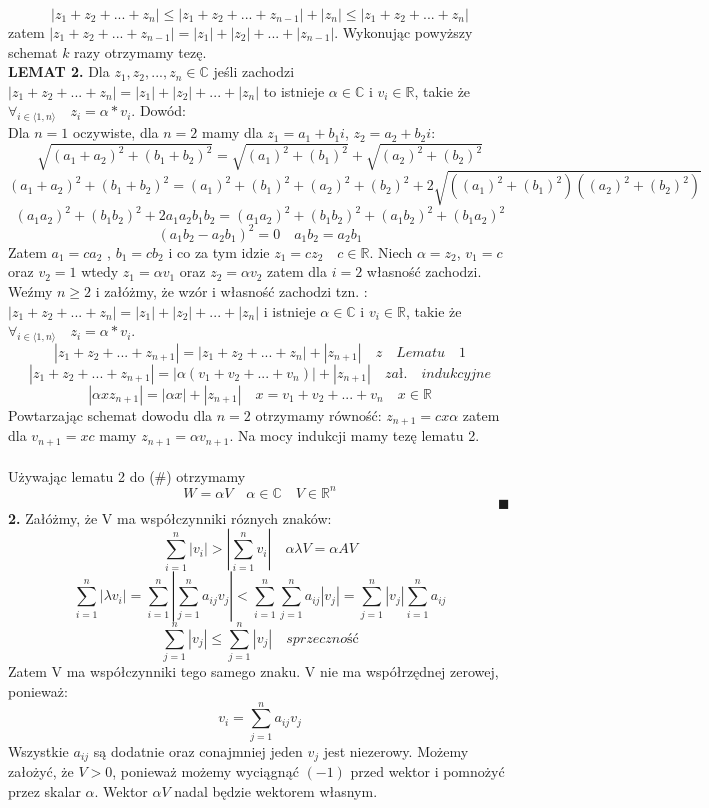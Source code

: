\documentclass[a4paper]{article}
\newcommand*{\field}[1]{\mathbb{#1}}
\begin{document}
\begin{adjustwidth}{30pt}{30pt}
$$|z_{1} + z_{2} + ... + z_{n}| \leq |z_{1} + z_{2} + ... + z_{n-1}| + |z_{n}| \leq |z_{1} + z_{2} + ... + z_{n}|$$ zatem $|z_{1} + z_{2} + ... + z_{n-1}| = |z_{1}| + |z_{2}| + ... + |z_{n-1}|$. Wykonując powyższy schemat $k$ razy otrzymamy tezę.\\
\textbf{LEMAT 2.} Dla $z_{1},z_{2},...,z_{n} \in \field{C}$ jeśli zachodzi $|z_{1} + z_{2} + ... + z_{n}| = |z_{1}| + |z_{2}| + ... + |z_{n}|$ to istnieje $\alpha \in  \field{C}$ i $v_{i} \in \field{R}$, takie że $\forall_{i \in \langle 1,n\rangle} \quad z_{i} = \alpha * v_{i}$. Dowód:\\
Dla $ n = 1$ oczywiste, dla $n = 2$ mamy dla $z_{1} = a_{1} + b_{1}i$, $z_{2} = a_{2} + b_{2}i$:
$$\sqrt{(a_{1} + a_{2})^2 +(b_{1} + b_{2})^2} = \sqrt{(a_{1})^2 + (b_{1})^2} + \sqrt{(a_{2})^2 + (b_{2})^2}$$
$$(a_{1} + a_{2})^2 +(b_{1} + b_{2})^2 = (a_{1})^2 + (b_{1})^2 + (a_{2})^2 + (b_{2})^2 + 2\sqrt{((a_{1})^2 + (b_{1})^2)((a_{2})^2 + (b_{2})^2)}$$
$$(a_{1}a_{2})^2 + (b_{1}b_{2})^2 + 2a_{1}a_{2}b_{1}b_{2} = (a_{1}a_{2})^2 + (b_{1}b_{2})^2 + (a_{1}b_{2})^2 + (b_{1}a_{2})^2$$
$$ (a_{1}b_{2} - a_{2}b_{1})^2 = 0 \quad a_{1}b_{2} = a_{2}b_{1}$$
Zatem $a_{1} = ca_{2}$ , $b_{1} = cb_{2}$ i co za tym idzie $z_{1} = cz_{2} \quad c \in \field{R}$. Niech $\alpha = z_{2}$, $v_{1} = c$ oraz $v_{2} = 1$ wtedy $z_{1} = \alpha v_{1}$ oraz $z_{2} = \alpha v_{2}$ zatem dla $i = 2$ własność zachodzi.\\
Weźmy $ n  \geq 2$ i załóżmy, że wzór i własność zachodzi tzn. : $|z_{1} + z_{2} + ... + z_{n}| = |z_{1}| + |z_{2}| + ... + |z_{n}|$ i istnieje $\alpha \in  \field{C}$ i $v_{i} \in \field{R}$, takie że $\forall_{i \in \langle 1,n\rangle} \quad z_{i} = \alpha * v_{i}$.
$$|z_{1} + z_{2} + ... + z_{n + 1}| = |z_{1} + z_{2} + ... + z_{n}| + |z_{n+1}| \quad z \quad Lematu \quad 1$$
$$|z_{1} + z_{2} + ... + z_{n + 1}| = |\alpha(v_{1} + v_{2} + ... + v_{n})| + |z_{n+1}| \quad zał. \quad indukcyjne$$
$$|\alpha x z_{n + 1}| = |\alpha x| + |z_{n+1}| \quad x = v_{1} + v_{2} + ... + v_{n} \quad x \in \field{R}$$
Powtarzając schemat dowodu dla $ n = 2$ otrzymamy równość: $z_{n+1} = cx\alpha$ zatem dla $v_{n+1} = xc$ mamy $z_{n+1} = \alpha v_{n + 1}$. Na mocy indukcji mamy tezę lematu 2.\\\\
Używając lematu 2 do (\#) otrzymamy
$$W = \alpha V \quad \alpha \in \field{C} \quad V \in \field{R}^{n}$$
$\hspace{420pt}\blacksquare$
\textbf{2.} Załóżmy, że V ma współczynniki róznych znaków:
$$\sum_{i=1}^{n}|v_{i}| > |\sum_{i=1}^{n}v_{i}| \quad \alpha \lambda V = \alpha A V$$
$$\sum_{i=1}^{n}|\lambda v_{i}| = \sum_{i=1}^{n}|\sum_{j=1}^{n}a_{ij}v_{j}| < \sum_{i=1}^{n}\sum_{j=1}^{n}a_{ij}|v_{j}| = \sum_{j=1}^{n}|v_{j}|\sum_{i=1}^{n}a_{ij}$$
$$\sum_{j=1}^{n}|v_{j}| \leq \sum_{j=1}^{n}|v_{j}| \quad sprzeczność$$
Zatem V ma współczynniki tego samego znaku. V nie ma współrzędnej zerowej, ponieważ:
$$v_{i} = \sum_{j=1}^{n}a_{ij}v_{j}$$
Wszystkie $a_{ij}$ są dodatnie oraz conajmniej jeden $v_{j}$ jest niezerowy. Możemy założyć, że $ V > 0$, ponieważ możemy wyciągnąć $(-1)$ przed wektor i pomnożyć przez skalar $\alpha$. Wektor $\alpha V$ nadal będzie wektorem własnym.\\


\end{adjustwidth}
\end{document}
